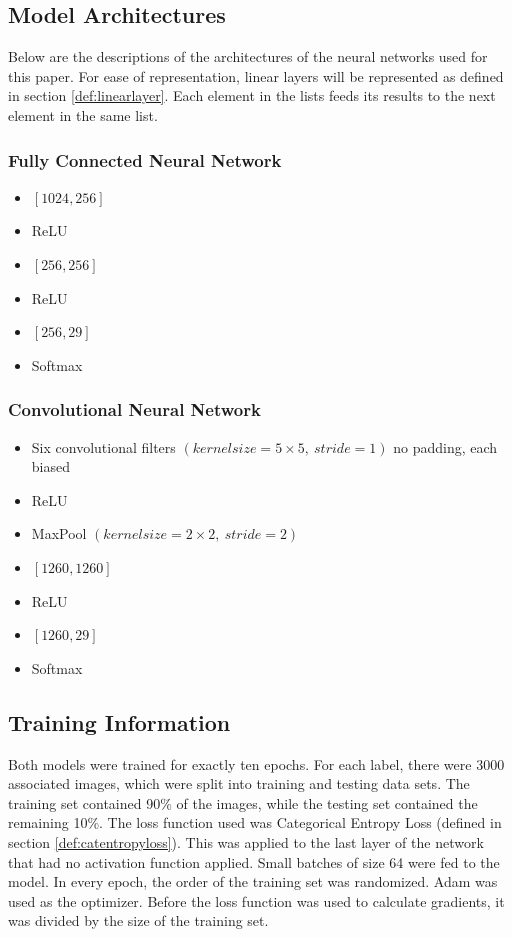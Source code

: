 \documentclass[10pt,Times New Roman]{article}
\begin{document}
    \subsection{Model Architectures}
    Below are the descriptions of the architectures of the neural networks used for this paper.
    For ease of representation, linear layers will be represented as defined in section 
    \ref{def:linearlayer}. Each element in the lists feeds its results to the next element in
    the same list.

        \subsubsection{Fully Connected Neural Network}
        \begin{itemize}[label=$\rightarrow$]
            \item $[1024, 256]$
            \item ReLU
            \item $[256, 256]$
            \item ReLU
            \item $[256, 29]$
            \item Softmax
        \end{itemize}
      
        \pagebreak
        \subsubsection{Convolutional Neural Network}
        \begin{itemize}[label=$\rightarrow$]
            \item Six convolutional filters $(kernel size=5\times5,\ stride = 1)$ no padding, each biased
            \item ReLU
            \item MaxPool $(kernel size= 2\times2,\ stride = 2)$
            \item $[1260, 1260]$
            \item ReLU
            \item $[1260,29]$
            \item Softmax
        \end{itemize}

    \subsection{Training Information}
        Both models were trained for exactly ten epochs. For each label, there were 3000 
        associated images, which were split into training and testing data sets. The 
        training set contained 90\% of the images, while the testing set contained the
        remaining 10\%. The loss function used was Categorical Entropy Loss (defined in 
        section \ref{def:catentropyloss}). This was applied to the last layer of the network that 
        had no activation function applied. Small batches of size 64 were fed to the model.
        In every epoch, the order of the training set was randomized. Adam was used as the
        optimizer. Before the loss function was used to calculate gradients, it was divided
        by the size of the training set.
\end{document}
